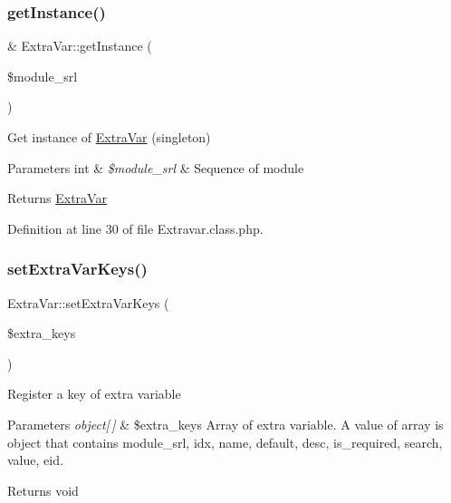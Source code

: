 \hypertarget{classExtraVar_ad65adf9c2fc8c077dd2764b4faf2d8c4}{}\label{classExtraVar_ad65adf9c2fc8c077dd2764b4faf2d8c4} 
\subsubsection{\texorpdfstring{get\+Instance()}{getInstance()}}
{\footnotesize\ttfamily \& Extra\+Var\+::get\+Instance (\begin{DoxyParamCaption}\item[{}]{\$module\+\_\+srl }\end{DoxyParamCaption})}

Get instance of \hyperlink{classExtraVar}{Extra\+Var} (singleton)


\begin{DoxyParams}[1]{Parameters}
int & {\em \$module\+\_\+srl} & Sequence of module \\
\hline
\end{DoxyParams}
\begin{DoxyReturn}{Returns}
\hyperlink{classExtraVar}{Extra\+Var} 
\end{DoxyReturn}


Definition at line 30 of file Extravar.\+class.\+php.

\hypertarget{classExtraVar_a8e5bb2ebfd6da9d82e78596b5e760e58}{}\label{classExtraVar_a8e5bb2ebfd6da9d82e78596b5e760e58} 
\subsubsection{\texorpdfstring{set\+Extra\+Var\+Keys()}{setExtraVarKeys()}}
{\footnotesize\ttfamily Extra\+Var\+::set\+Extra\+Var\+Keys (\begin{DoxyParamCaption}\item[{}]{\$extra\+\_\+keys }\end{DoxyParamCaption})}

Register a key of extra variable


\begin{DoxyParams}{Parameters}
{\em object\mbox{[}$\,$\mbox{]}} & \$extra\+\_\+keys Array of extra variable. A value of array is object that contains module\+\_\+srl, idx, name, default, desc, is\+\_\+required, search, value, eid. \\
\hline
\end{DoxyParams}
\begin{DoxyReturn}{Returns}
void 
\end{DoxyReturn}


